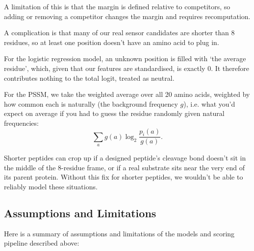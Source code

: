 \documentclass[10pt,a4paper]{article}
\numberwithin{equation}{section}
\begin{document}
A limitation of this is that the margin is defined relative to competitors, so adding or removing a competitor changes the margin and requires recomputation.

A complication is that many of our real sensor candidates are shorter than 8 residues, so at least one position doesn't have an amino acid to plug in. 

For the logistic regression model, an unknown position is filled with `the average residue', which, given that our features are standardised, is exactly 0. It therefore contributes nothing to the total logit, treated as neutral.

For the PSSM, we take the weighted average over all 20 amino acids, weighted by how common each is naturally (the background frequency $g$), i.e. what you'd expect on average if you had to guess the residue randomly given natural frequencies:
\begin{equation}
\sum_{a} g(a) \log_2 \frac{p_i(a)}{g(a)}.
\label{eq:gap_pssm}
\end{equation}

Shorter peptides can crop up if a designed peptide's cleavage bond doesn't sit in the middle of the 8-residue frame, or if a real substrate sits near the very end of its parent protein. Without this fix for shorter peptides, we wouldn't be able to reliably model these situations.

\subsection{Assumptions and Limitations}

Here is a summary of assumptions and limitations of the models and scoring pipeline described above:
\end{document}
